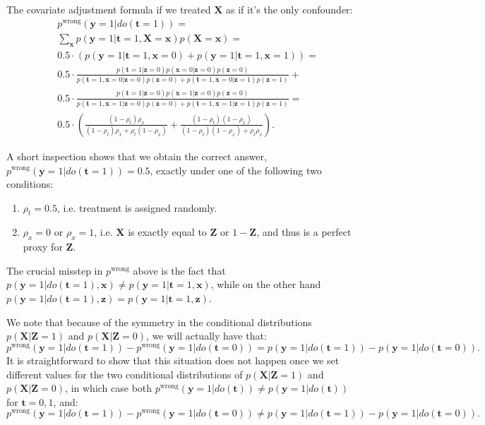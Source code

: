 \documentclass{article}
\def\*#1{\mathbf{#1}}
\begin{document}
The covariate adjustment formula if we treated $\*X$ as if it's the only confounder:
\begin{align*}
&p^{\text{wrong}}(\*y=1|do(\*t=1)) = \\
&\sum_\*x p(\*y=1|\*t=1,\*X=\*x)p(\*X=\*x) = \\
&0.5 \cdot \left(p(\*y=1|\*t=1,\*x=0) + p(\*y=1|\*t=1,\*x=1)\right) = \\
&0.5\cdot\frac{p(\*t=1|\*z=0) p(\*x=0|\*z=0) p(\*z=0)}{p(\*t=1,\*x=0|\*z=0)p(\*z=0) + p(\*t=1,\*x=0|\*z=1)p(\*z=1)} + \\
& 0.5 \cdot \frac{p(\*t=1|\*z=0) p(\*x=1|\*z=0) p(\*z=0)}{p(\*t=1,\*x=1|\*z=0)p(\*z=0) + p(\*t=1,\*x=1|\*z=1)p(\*z=1)} = \\
& 0.5 \cdot  \left(\frac{(1-\rho_t)\rho_x}{(1-\rho_t) \rho_x + \rho_t (1-\rho_x)} + \frac{(1-\rho_t)(1-\rho_x)}{(1-\rho_t)(1-\rho_x) + \rho_t \rho_x}\right).
\end{align*}

A short inspection shows that we obtain the correct answer, $p^{\text{wrong}}(\*y=1|do(\*t=1)) = 0.5$, exactly under one of the following two conditions:
\begin{enumerate}
\item $\rho_t = 0.5$, i.e. treatment is assigned randomly.
\item $\rho_x = 0$ or $\rho_x = 1$, i.e. $\*X$ is exactly equal to $\*Z$ or $1-\*Z$, and thus is a perfect proxy for $\*Z$.
\end{enumerate}


The crucial misstep in $p^{\text{wrong}}$ above is the fact that
 $p(\*y=1|do(\*t=1),\*x) \neq p(\*y=1|\*t=1,\*x)$, while on the other hand $p(\*y=1|do(\*t=1),\*z) = p(\*y=1|\*t=1,\*z)$.
 
We note that because of the symmetry in the conditional distributions $p(\*X|\*Z=1)$ and $p(\*X|\*Z=0)$, we will actually have that:
$$p^{\text{wrong}}(\*y=1|do(\*t=1))  - p^{\text{wrong}}(\*y=1|do(\*t=0)) = p(\*y=1|do(\*t=1))  - p(\*y=1|do(\*t=0)).$$
 It is straightforward to show that this situation does not happen once we set different values for the two conditional distributions of $p(\*X|\*Z=1)$ and $p(\*X|\*Z=0)$, in which case both $p^{\text{wrong}}(\*y=1|do(\*t)) \neq p(\*y=1|do(\*t))$ for $\*t=0,1$, and: $$p^{\text{wrong}}(\*y=1|do(\*t=1))  - p^{\text{wrong}}(\*y=1|do(\*t=0)) \neq p(\*y=1|do(\*t=1))  - p(\*y=1|do(\*t=0)).$$
  
\end{document}
